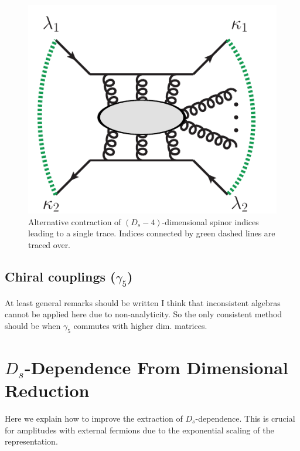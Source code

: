 \begin{figure}[]
  \begin{center}
  	\includegraphics[scale=0.5]
    {figures/singleTrace.pdf}
\end{center} 
\caption{Alternative contraction of $(D_s-4)$-dimensional spinor indices leading to a
single trace. Indices connected by green dashed lines are traced
over.}
\label{fig_SingleTrace}
\end{figure}





\subsection{Chiral couplings ($\gamma_5$)}

At least general remarks should be written I think that inconsistent algebras cannot
be applied here due to non-analyticity. So the only consistent method should be when $\gamma_5$ commutes
with higher dim. matrices.

\section{$D_s$-Dependence From Dimensional Reduction}
Here we explain how to improve the extraction of $D_s$-dependence.
This is crucial for amplitudes with external fermions due to the exponential scaling of the representation.


